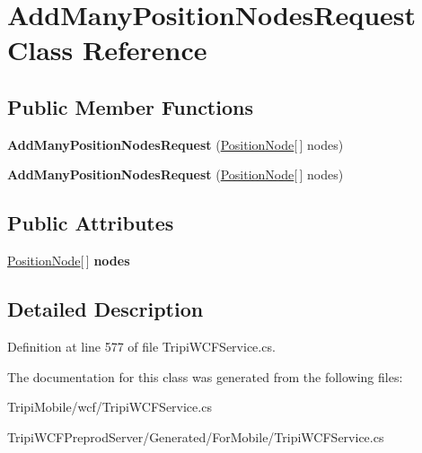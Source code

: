 \hypertarget{class_add_many_position_nodes_request}{
\section{AddManyPositionNodesRequest Class Reference}
\label{class_add_many_position_nodes_request}
}
\subsection*{Public Member Functions}
\begin{DoxyCompactItemize}
\item 
\hypertarget{class_add_many_position_nodes_request_a6edeef32ec501af4f38d3906e1dc0ee2}{
{\bfseries AddManyPositionNodesRequest} (\hyperlink{class_position_node}{PositionNode}\mbox{[}$\,$\mbox{]} nodes)}
\label{class_add_many_position_nodes_request_a6edeef32ec501af4f38d3906e1dc0ee2}

\item 
\hypertarget{class_add_many_position_nodes_request_a6edeef32ec501af4f38d3906e1dc0ee2}{
{\bfseries AddManyPositionNodesRequest} (\hyperlink{class_position_node}{PositionNode}\mbox{[}$\,$\mbox{]} nodes)}
\label{class_add_many_position_nodes_request_a6edeef32ec501af4f38d3906e1dc0ee2}

\end{DoxyCompactItemize}
\subsection*{Public Attributes}
\begin{DoxyCompactItemize}
\item 
\hypertarget{class_add_many_position_nodes_request_ac855cc8bf2c3203462deb761a5baf0d0}{
\hyperlink{class_position_node}{PositionNode}\mbox{[}$\,$\mbox{]} {\bfseries nodes}}
\label{class_add_many_position_nodes_request_ac855cc8bf2c3203462deb761a5baf0d0}

\end{DoxyCompactItemize}


\subsection{Detailed Description}


Definition at line 577 of file TripiWCFService.cs.

The documentation for this class was generated from the following files:\begin{DoxyCompactItemize}
\item 
TripiMobile/wcf/TripiWCFService.cs\item 
TripiWCFPreprodServer/Generated/ForMobile/TripiWCFService.cs\end{DoxyCompactItemize}
